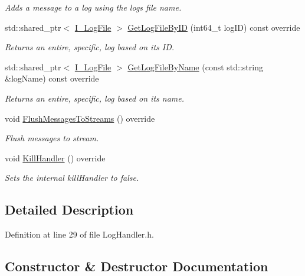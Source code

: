 \begin{DoxyCompactItemize}
\begin{DoxyCompactList}\small\item\em Adds a message to a log using the logs file name. \end{DoxyCompactList}\item 
std\+::shared\+\_\+ptr$<$ \mbox{\hyperlink{classLoggerClasses_1_1I__LogFile}{I\+\_\+\+Log\+File}} $>$ \mbox{\hyperlink{classLoggerClasses_1_1LogHandler_a7f277be7cd639c6b37e2753df1f4925c}{Get\+Log\+File\+By\+ID}} (int64\+\_\+t log\+ID) const override
\begin{DoxyCompactList}\small\item\em Returns an entire, specific, log based on its ID. \end{DoxyCompactList}\item 
std\+::shared\+\_\+ptr$<$ \mbox{\hyperlink{classLoggerClasses_1_1I__LogFile}{I\+\_\+\+Log\+File}} $>$ \mbox{\hyperlink{classLoggerClasses_1_1LogHandler_ae6a51c1ec30e7aef116be8c906e8387f}{Get\+Log\+File\+By\+Name}} (const std\+::string \&log\+Name) const override
\begin{DoxyCompactList}\small\item\em Returns an entire, specific, log based on its name. \end{DoxyCompactList}\item 
void \mbox{\hyperlink{classLoggerClasses_1_1LogHandler_adf0211bf69aef576ea9585933d24086d}{Flush\+Messages\+To\+Streams}} () override
\begin{DoxyCompactList}\small\item\em Flush messages to stream. \end{DoxyCompactList}\item 
void \mbox{\hyperlink{classLoggerClasses_1_1LogHandler_a5cff5ca829dc09d1d73e02e63eb65a0a}{Kill\+Handler}} () override
\begin{DoxyCompactList}\small\item\em Sets the internal kill\+Handler to false. \end{DoxyCompactList}\end{DoxyCompactItemize}


\subsection{Detailed Description}


Definition at line 29 of file Log\+Handler.\+h.



\subsection{Constructor \& Destructor Documentation}
\mbox{\label{classLoggerClasses_1_1LogHandler_a6541f77d814d526ff05628da3940573e}} 
